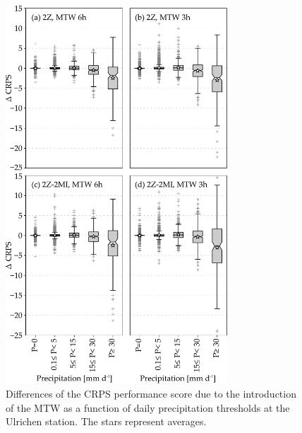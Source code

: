 \documentclass[hess, manuscript]{copernicus}
\begin{document}
	\begin{figure}[htb]
		\includegraphics[width=8.3cm]{fig10.pdf}
		\caption{Differences of the CRPS performance score due to the introduction of the MTW as a function of daily precipitation thresholds at the Ulrichen station. The stars represent averages.}
		\label{fig:changes_CRPS_precip_threshold}
	\end{figure}
\end{document}
